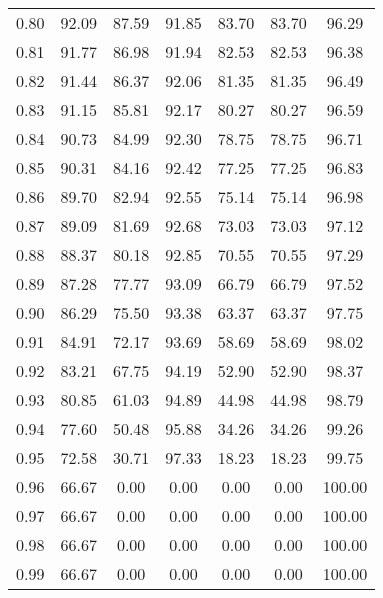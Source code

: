\begin{tabular}{|c|c|c|c|c|c|c|}
      0.80 &     92.09 &     87.59 &      91.85 &   83.70 &      83.70 &         96.29 \\
      0.81 &     91.77 &     86.98 &      91.94 &   82.53 &      82.53 &         96.38 \\
      0.82 &     91.44 &     86.37 &      92.06 &   81.35 &      81.35 &         96.49 \\
      0.83 &     91.15 &     85.81 &      92.17 &   80.27 &      80.27 &         96.59 \\
      0.84 &     90.73 &     84.99 &      92.30 &   78.75 &      78.75 &         96.71 \\
      0.85 &     90.31 &     84.16 &      92.42 &   77.25 &      77.25 &         96.83 \\
      0.86 &     89.70 &     82.94 &      92.55 &   75.14 &      75.14 &         96.98 \\
      0.87 &     89.09 &     81.69 &      92.68 &   73.03 &      73.03 &         97.12 \\
      0.88 &     88.37 &     80.18 &      92.85 &   70.55 &      70.55 &         97.29 \\
      0.89 &     87.28 &     77.77 &      93.09 &   66.79 &      66.79 &         97.52 \\
      0.90 &     86.29 &     75.50 &      93.38 &   63.37 &      63.37 &         97.75 \\
      0.91 &     84.91 &     72.17 &      93.69 &   58.69 &      58.69 &         98.02 \\
      0.92 &     83.21 &     67.75 &      94.19 &   52.90 &      52.90 &         98.37 \\
      0.93 &     80.85 &     61.03 &      94.89 &   44.98 &      44.98 &         98.79 \\
      0.94 &     77.60 &     50.48 &      95.88 &   34.26 &      34.26 &         99.26 \\
      0.95 &     72.58 &     30.71 &      97.33 &   18.23 &      18.23 &         99.75 \\
      0.96 &     66.67 &      0.00 &       0.00 &    0.00 &       0.00 &        100.00 \\
      0.97 &     66.67 &      0.00 &       0.00 &    0.00 &       0.00 &        100.00 \\
      0.98 &     66.67 &      0.00 &       0.00 &    0.00 &       0.00 &        100.00 \\
      0.99 &     66.67 &      0.00 &       0.00 &    0.00 &       0.00 &        100.00 \\
\bottomrule
\end{tabular}
